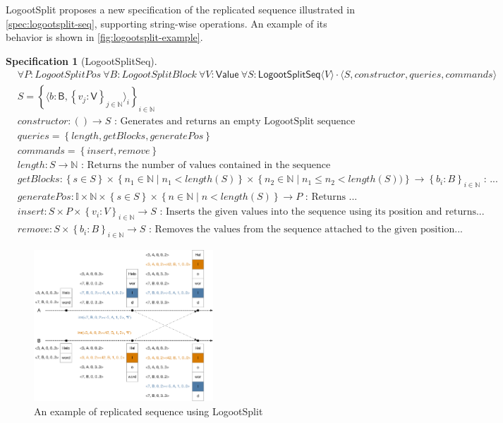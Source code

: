 \documentclass{article}
\newcommand{\commands}[1]{commands = \set{#1}}
\newcommand{\fnspec}[3]{#1: #2 \text{ : #3}}
\newcommand{\inbb}[1]{\in \mathbb{#1}}
\newcommand{\mathlist}[2]{\set{#1_i: #2}_{i \inbb{N}}}
\newcommand{\queries}[1]{queries = \set{#1}}
\newcommand{\set}[1]{\left\{#1\right\}} %
\newcommand{\spectuple}[1]{\tuple{#1, constructor, queries, commands}}
\newcommand{\ssep}{\mid} %
\newcommand{\tuple}[1]{\langle #1 \rangle}
\theoremstyle{definition}
\theoremstyle{definition}
\theoremstyle{definition}
\newcounter{specificationcounter}
\theoremstyle{definition}
\newtheorem{specification}[specificationcounter]{Specification}
\begin{document}
LogootSplit proposes a new specification of the replicated sequence illustrated in \autoref{spec:logootsplit-seq}, supporting string-wise operations. An example of its behavior is shown in \autoref{fig:logootsplit-example}.

\begin{specification}[LogootSplitSeq]
    \begin{align*}
    &\forall P: LogootSplitPos \ \forall B: LogootSplitBlock \ \forall V: \mathsf{Value} \ \forall S: \mathsf{LogootSplitSeq} \tuple{V} \cdot \spectuple{S}\\
    &S = \set{\tuple{b: \mathsf{B}, \set{v_j: \mathsf{V}}_{j \inbb {N}}}_i}_{i \inbb{N}}\\
    &\fnspec{constructor}{\left( \right) \to S}{Generates and returns an empty LogootSplit sequence}\\
    &\queries{length, getBlocks, generatePos}\\
    &\commands{insert, remove}\\
    &\fnspec{length}{S \to \mathbb{N}}{Returns the number of values contained in the sequence}\\
    &\fnspec{getBlocks}{\set{s \in S} \times \set{n_1 \inbb{N} \ssep n_1 < length(S)} \times \set{n_2 \inbb{N} \ssep n_1 \leq n_2 < length(S))} \to \mathlist{b}{B}}{...}\\
    &\fnspec{generatePos}{\mathbb{I} \times \mathbb{N} \times \set{s \in S} \times \set{n \inbb{N} \ssep n < length(S)} \to P}{Returns ...}\\
    &\fnspec{insert}{S \times P \times \mathlist{v}{V} \to S}{Inserts the given values into the sequence using its position and returns...}\\
    &\fnspec{remove}{S \times \mathlist{b}{B} \to S}{Removes the values from the sequence attached to the given position...}
    \end{align*}
    \label{spec:logootsplit-seq}
\end{specification}

\begin{figure}
    \centering
        \includegraphics[width=0.6\textwidth]{img/logootsplit-seq.pdf}
    \caption{An example of replicated sequence using LogootSplit}
    \label{fig:logootsplit-example}
\end{figure}
\end{document}
